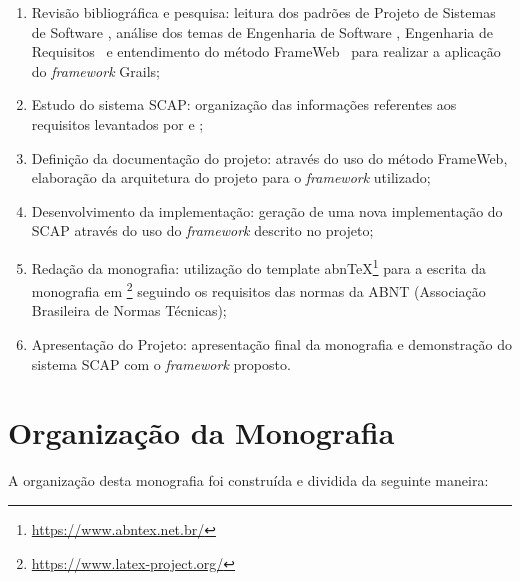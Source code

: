 \begin{enumerate}

    \item Revisão bibliográfica e pesquisa: leitura dos padrões de Projeto de Sistemas de Software \cite{falbo:pss18}, análise dos temas de Engenharia de Software \cite{falbo:es14}, Engenharia de Requisitos~\cite{falbo:er17} e entendimento do método FrameWeb~\cite{souza:masterthesis07} para realizar a aplicação do \textit{framework} Grails;
    \item Estudo do sistema SCAP: organização das informações referentes aos requisitos levantados por  e ;
    \item Definição da documentação do projeto: através do uso do método FrameWeb, elaboração da arquitetura do projeto para o \textit{framework} utilizado;
    \item Desenvolvimento da implementação: geração de uma nova implementação do SCAP através do uso do \textit{framework} descrito no projeto; 
    \item Redação da monografia: utilização do template abnTeX\footnote{\url{https://www.abntex.net.br/}} para a escrita da monografia em \latex\footnote{\url{https://www.latex-project.org/}} seguindo os requisitos das normas da ABNT (Associação Brasileira de Normas Técnicas);
    \item Apresentação do Projeto: apresentação final da monografia e demonstração do sistema SCAP com o \textit{framework} proposto.

\end{enumerate}    


\section{Organização da Monografia}
\label{sec-intro-organizacao}


A organização desta monografia foi construída e dividida da seguinte maneira:

